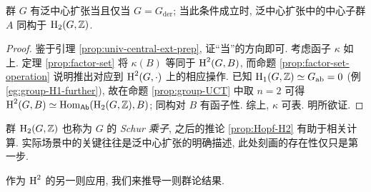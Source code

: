 \begin{theorem}
	群 $G$ 有泛中心扩张当且仅当 $G = G_{\mathrm{der}}$; 当此条件成立时, 泛中心扩张中的中心子群 $A$ 同构于 $\operatorname{H}_2(G, \mathbb{Z})$.
\end{theorem}
\begin{proof}
	鉴于引理 \ref{prop:univ-central-ext-prep}, 证``当''的方向即可. 考虑函子 $\kappa$ 如上. 定理 \ref{prop:factor-set} 将 $\kappa(B)$ 等同于 $\operatorname{H}^2(G, B)$, 而命题 \ref{prop:factor-set-operation} 说明推出对应到 $\operatorname{H}^2(G, \cdot)$ 上的相应操作. 已知 $\operatorname{H}_1(G, \mathbb{Z}) \simeq G_{\mathrm{ab}} = 0$ (例 \ref{eg:group-H1-further}), 故在命题 \ref{prop:group-UCT} 中取 $n=2$ 可得 $\operatorname{H}^2(G, B) \simeq \operatorname{Hom}_{\mathsf{Ab}}(\operatorname{H}_2(G, \mathbb{Z}), B)$; 同构对 $B$ 有函子性. 综上, $\kappa$ 可表. 明所欲证.
\end{proof}

群 $\operatorname{H}_2(G, \mathbb{Z})$ 也称为 $G$ 的 \emph{Schur 乘子}, 之后的推论 \ref{prop:Hopf-H2} 有助于相关计算. 实际场景中的关键往往是泛中心扩张的明确描述, 此处刻画的存在性仅只是第一步.

作为 $\operatorname{H}^2$ 的另一则应用, 我们来推导一则群论结果.

